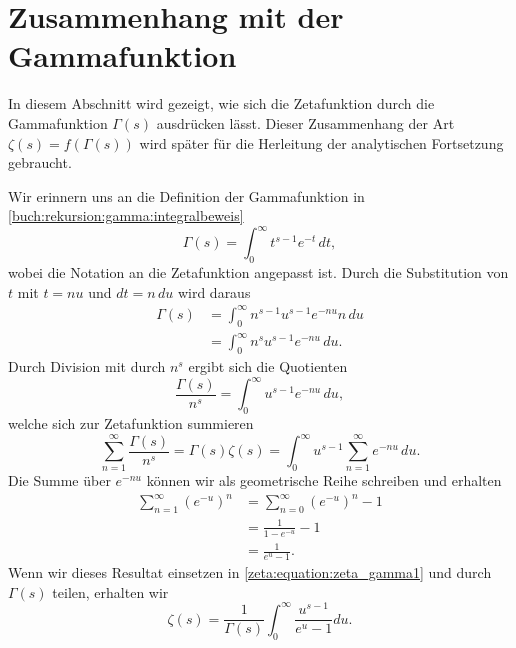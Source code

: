 \section{Zusammenhang mit der Gammafunktion} \label{zeta:section:zusammenhang_mit_gammafunktion}

In diesem Abschnitt wird gezeigt, wie sich die Zetafunktion durch die Gammafunktion $\Gamma(s)$ ausdrücken lässt.
Dieser Zusammenhang der Art $\zeta(s) = f(\Gamma(s))$ wird später für die Herleitung der analytischen Fortsetzung gebraucht.

Wir erinnern uns an die Definition der Gammafunktion in \ref{buch:rekursion:gamma:integralbeweis}
\begin{equation*}
    \Gamma(s)
    =
    \int_0^{\infty} t^{s-1} e^{-t} \,dt,
\end{equation*}
wobei die Notation an die Zetafunktion angepasst ist.
Durch die Substitution von $t$ mit $t = nu$ und $dt = n\,du$ wird daraus
\begin{align*}
    \Gamma(s)
    &=
    \int_0^{\infty} n^{s-1}u^{s-1} e^{-nu} n \,du \\
    &=
    \int_0^{\infty} n^s u^{s-1} e^{-nu} \,du.
\end{align*}
Durch Division mit durch $n^s$ ergibt sich die Quotienten
\begin{equation*}
    \frac{\Gamma(s)}{n^s}
    =
    \int_0^{\infty} u^{s-1} e^{-nu} \,du,
\end{equation*}
welche sich zur Zetafunktion summieren
\begin{equation}
    \sum_{n=1}^{\infty} \frac{\Gamma(s)}{n^s}
    =
    \Gamma(s) \zeta(s)
    =
    \int_0^{\infty} u^{s-1}
    \sum_{n=1}^{\infty}e^{-nu}
    \,du.
    \label{zeta:equation:zeta_gamma1}
\end{equation}
Die Summe über $e^{-nu}$ können wir als geometrische Reihe schreiben und erhalten
\begin{align}
    \sum_{n=1}^{\infty}\left(e^{-u}\right)^n
    &=
    \sum_{n=0}^{\infty}\left(e^{-u}\right)^n
    -
    1
    \\
    &=
    \frac{1}{1 - e^{-u}} - 1
    \\
    &=
    \frac{1}{e^u - 1}.
\end{align}
Wenn wir dieses Resultat einsetzen in \eqref{zeta:equation:zeta_gamma1} und durch $\Gamma(s)$ teilen, erhalten wir %
\begin{equation}\label{zeta:equation:zeta_gamma_final}
    \zeta(s)
    =
    \frac{1}{\Gamma(s)}
    \int_0^{\infty}
    \frac{u^{s-1}}{e^u -1}
    du.
\end{equation}
